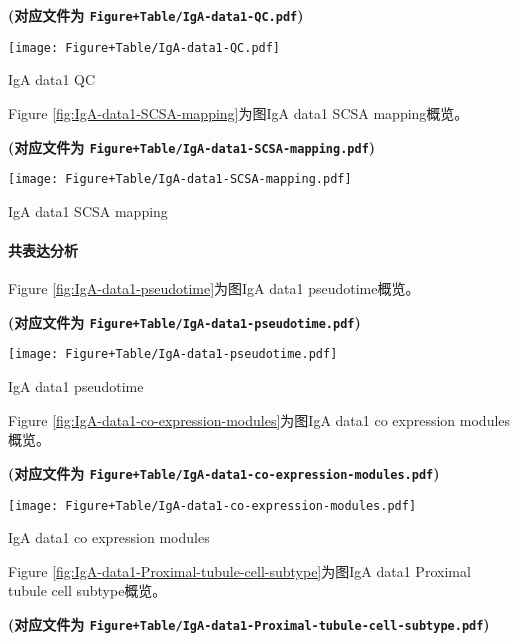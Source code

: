 \documentclass[
]{article}
\begin{document}
\textbf{(对应文件为 \texttt{Figure+Table/IgA-data1-QC.pdf})}

\def\@captype{figure}
\begin{center}
\texttt{[image: Figure+Table/IgA-data1-QC.pdf]}
\caption{IgA data1 QC}\label{fig:IgA-data1-QC}
\end{center}

Figure \ref{fig:IgA-data1-SCSA-mapping}为图IgA data1 SCSA mapping概览。

\textbf{(对应文件为 \texttt{Figure+Table/IgA-data1-SCSA-mapping.pdf})}

\def\@captype{figure}
\begin{center}
\texttt{[image: Figure+Table/IgA-data1-SCSA-mapping.pdf]}
\caption{IgA data1 SCSA mapping}\label{fig:IgA-data1-SCSA-mapping}
\end{center}

\hypertarget{ux5171ux8868ux8fbeux5206ux6790-1}{%
\paragraph{共表达分析}\label{ux5171ux8868ux8fbeux5206ux6790-1}}

Figure \ref{fig:IgA-data1-pseudotime}为图IgA data1 pseudotime概览。

\textbf{(对应文件为 \texttt{Figure+Table/IgA-data1-pseudotime.pdf})}

\def\@captype{figure}
\begin{center}
\texttt{[image: Figure+Table/IgA-data1-pseudotime.pdf]}
\caption{IgA data1 pseudotime}\label{fig:IgA-data1-pseudotime}
\end{center}

Figure \ref{fig:IgA-data1-co-expression-modules}为图IgA data1 co expression modules概览。

\textbf{(对应文件为 \texttt{Figure+Table/IgA-data1-co-expression-modules.pdf})}

\def\@captype{figure}
\begin{center}
\texttt{[image: Figure+Table/IgA-data1-co-expression-modules.pdf]}
\caption{IgA data1 co expression modules}\label{fig:IgA-data1-co-expression-modules}
\end{center}

Figure \ref{fig:IgA-data1-Proximal-tubule-cell-subtype}为图IgA data1 Proximal tubule cell subtype概览。

\textbf{(对应文件为 \texttt{Figure+Table/IgA-data1-Proximal-tubule-cell-subtype.pdf})}
\end{document}
